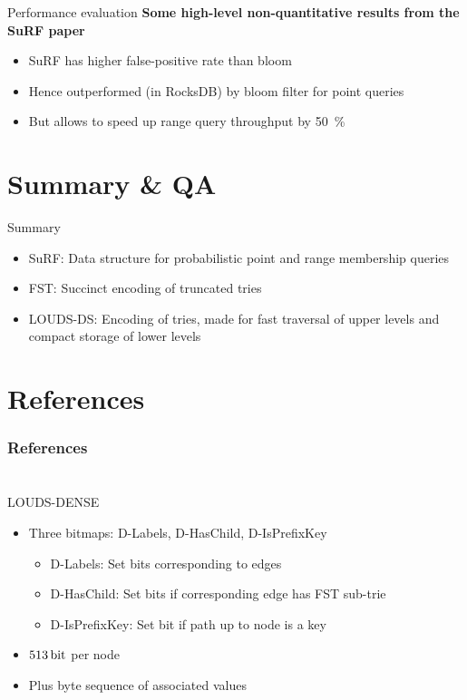 \documentclass{beamer}
\begin{document}

\begin{frame}{Performance evaluation}
		\textbf{Some high-level non-quantitative results from the SuRF paper}
		\begin{itemize}
				\item SuRF has higher false-positive rate than bloom
				\item Hence outperformed (in RocksDB) by bloom filter for point queries
				\item But allows to speed up range query throughput by \qty{50}{\percent}
		\end{itemize}
\end{frame}

\section{Summary \& QA}

\begin{frame}{Summary}
		\begin{itemize}
				\item SuRF: Data structure for probabilistic point and range
						membership queries
				\item FST: Succinct encoding of truncated tries
				\item LOUDS-DS: Encoding of tries, made for fast traversal of
						upper levels and compact storage of lower levels
		\end{itemize}
\end{frame}

\section{References}

\begin{frame}[allowframebreaks]
		\frametitle{References}
		\printbibliography
\end{frame}

\appendix
\section{\appendixname}

\begin{frame}{LOUDS-DENSE}
		\begin{itemize}
				\item Three bitmaps: D-Labels, D-HasChild, D-IsPrefixKey
						\begin{itemize}
								\item D-Labels: Set bits corresponding to edges
								\item D-HasChild: Set bits if corresponding edge has FST sub-trie
								\item D-IsPrefixKey: Set bit if path up to node is a key
						\end{itemize}
				\item $\qty{513}{\bit}$ per node
				\item Plus byte sequence of associated values
		\end{itemize}
\end{frame}
\end{document}
